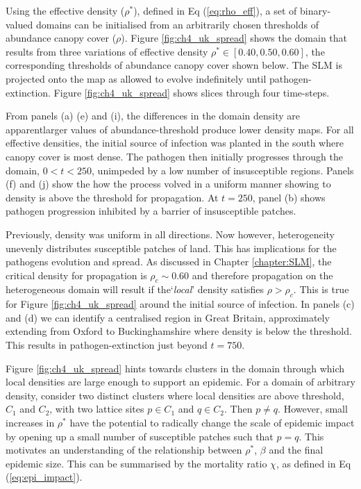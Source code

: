 Using the effective density ($\rho^{*}$), defined in Eq (\ref{eq:rho_eff}), a set of %
binary-valued domains can be initialised from an arbitrarily chosen thresholds of abundance %
canopy cover ($\rho$). %
Figure \ref{fig:ch4_uk_spread} shows the domain that results from three variations of effective density $\rho^{*} \in [0.40, 0.50, 0.60]$, the corresponding thresholds of abundance canopy cover shown below. %
The SLM is projected onto the map as allowed to evolve indefinitely until pathogen-extinction. %
Figure \ref{fig:ch4_uk_spread} shows slices through four time-steps. %

From panels (a) (e) and (i), the differences in the domain density are apparent\textemdash larger values of abundance-threshold produce lower density maps. %
For all effective densities, the initial source of infection was planted in the south where canopy cover is most dense. %
The pathogen then initially progresses through the domain, $0<t<250$, unimpeded by a low number of insusceptible regions. %
Panels (f) and (j) show the how the process volved in a uniform manner showing to density is above the threshold for propagation. %
At $t=250$, panel (b) shows pathogen progression inhibited by a barrier of insusceptible patches. %


Previously, density was uniform in all directions. %
Now however, heterogeneity unevenly distributes susceptible patches of land. %
This has implications for the pathogens evolution and spread. %
As discussed in Chapter \ref{chapter:SLM}, the critical density for propagation is $\rho_c\sim 0.60$ and therefore propagation on the heterogeneous domain will result if the`\textit{local}' density satisfies $\rho>\rho_c$. %
This is true for Figure \ref{fig:ch4_uk_spread} around the initial source of infection. %
In panels (c) and (d) we can identify a centralised region in Great Britain, approximately extending from Oxford to Buckinghamshire where density is below the threshold. 
This results in pathogen-extinction just beyond $t=750$. %

Figure \ref{fig:ch4_uk_spread} hints towards clusters in the domain through which local densities are large enough to support an epidemic. %
For a domain of arbitrary density, consider two distinct clusters where local densities are above threshold, $C_1$ and $C_2$, with two lattice sites $p\in C_1$ and $q\in C_2$. %
Then $p \neq q$. However, small increases in $\rho^{*}$ have the potential to radically change the scale of epidemic impact by opening up a small number of susceptible patches such that $p=q$. %
This motivates an understanding of the relationship between $\rho^*$, $\beta$ and the final epidemic size. %
This can be summarised by the mortality ratio $\chi$, as defined in Eq (\ref{eq:epi_impact}). %

